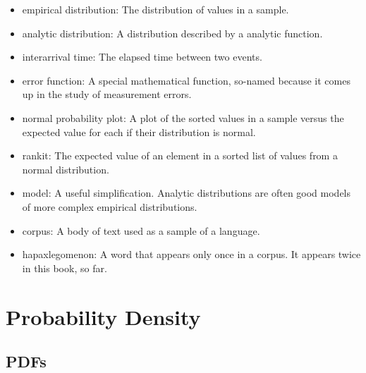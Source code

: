 \documentclass[12pt]{book}
\begin{document}
\begin{itemize}

\item empirical distribution: The distribution of values in a sample.

\item analytic distribution: A distribution described by a analytic
function.

\item interarrival time: The elapsed time between two events.

\item error function: A special mathematical function, so-named
  because it comes up in the study of measurement errors.

\item normal probability plot: A plot of the sorted values in a sample
versus the expected value for each if their distribution is normal.

\item rankit: The expected value of an element in a sorted list of
values from a normal distribution.

\item model: A useful simplification.  Analytic distributions are
often good models of more complex empirical distributions.

\item corpus: A body of text used as a sample of a language.

\item hapaxlegomenon: A word that appears only once in a corpus.
It appears twice in this book, so far.

\end{itemize}


\chapter{Probability Density}

\section{PDFs}
\label{density}
\end{document}
